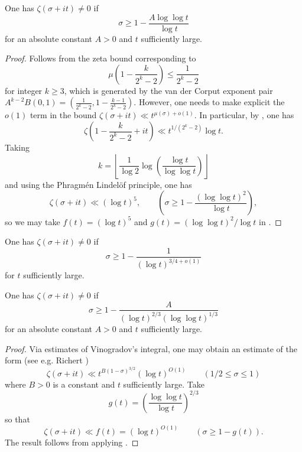 \begin{theorem}\label{zfr-littlewood}
One has $\zeta(\sigma + it) \ne 0$ if
\[
\sigma \ge 1 - \frac{A \log\log t}{\log t}
\]
for an absolute constant $A > 0$ and $t$ sufficiently large.
\end{theorem}
\begin{proof}
Follows from the zeta bound corresponding to
\[
\mu\left(1 - \frac{k}{2^k - 2}\right) \le \frac{1}{2^k - 2}
\]
for integer $k\ge 3$, which is generated by the van der Corput exponent pair $A^{k - 2}B(0, 1) = (\frac{1}{2^k - 2}, 1 - \frac{k - 1}{2^k - 2})$. However, one needs to make explicit the $o(1)$ term in the bound $\zeta(\sigma + it) \ll t^{\mu(\sigma) + o(1)}$. In particular, by \cite[Theorem 5.14]{titchmarsh_theory_1986}, one has
\[
\zeta(1 - \frac{k}{2^k - 2} + it) \ll t^{1/(2^k - 2)}\log t.
\]
Taking
\[
k = \left\lfloor \frac{1}{\log 2}\log\left(\frac{\log t}{\log\log t}\right)\right\rfloor
\]
and using the Phragm\'en Lindel\"of principle, one has
\[
\zeta(\sigma + it) \ll (\log t)^5,\qquad (\sigma \ge 1 - \frac{(\log\log t)^2}{\log t}),
\]
so we may take $f(t) = (\log t)^5$ and $g(t) = (\log\log t)^2/\log t$ in .
\end{proof}

\begin{theorem}\label{zfr-chudakov}
One has $\zeta(\sigma + it) \ne 0$ if
\[
\sigma \ge 1 - \frac{1}{(\log t)^{3/4 + o(1)}}
\]
for $t$ sufficiently large.
\end{theorem}

\begin{theorem}\label{zfr-vk}
One has $\zeta(\sigma + it) \ne 0$ if
\[
\sigma \ge 1 - \frac{A}{(\log t)^{2/3}(\log\log t)^{1/3}}
\]
for an absolute constant $A > 0$ and $t$ sufficiently large.
\end{theorem}
\begin{proof}
Via estimates of Vinogradov's integral, one may obtain an estimate of the form (see e.g. Richert \cite{richert_zur_1967})
\[
\zeta(\sigma + it) \ll t^{B(1 - \sigma)^{3/2}}(\log t)^{O(1)}\qquad (1/2 \le \sigma \le 1)
\]
where $B > 0$ is a constant and $t$ sufficiently large. Take
\[
g(t) = \left(\frac{\log\log t}{\log t}\right)^{2/3}
\]
so that
\[
\zeta(\sigma + it) \ll f(t) = (\log t)^{O(1)}\qquad (\sigma \ge 1 - g(t)).
\]
The result follows from applying .
\end{proof}


